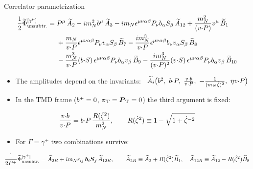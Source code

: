 \begin{frame}{Correlator parametrization}
  \footnotesize
  \begin{align*}
    \frac{1}{2}\widetilde \Phi^{[\gamma^\mu]}_{\text{unsubtr.}} ={}& P^\mu\, \widetilde{A}_2 - i m_N^2 b^\mu\, \widetilde{A}_3 - i m_N \epsilon^{\mu \nu \alpha \beta} P_\nu b_\alpha S_\beta\, \widetilde{A}_{12} + \frac{m_N^2}{(v {\cdot} P)} v^\mu\, \widetilde{B}_1\\
    & + \frac{m_N}{v {\cdot} P} \epsilon^{\mu \nu \alpha \beta} P_\nu v_\alpha S_\beta\, \widetilde{B}_7 - \frac{i m_N^3}{v {\cdot} P} \epsilon^{\mu \nu \alpha \beta} b_\nu v_\alpha S_\beta\, \widetilde{B}_8\\
    & - \frac{m_N^3}{v {\cdot} P} (b {\cdot} S)\, \epsilon^{\mu \nu \alpha \beta} P_\nu b_\alpha v_\beta\, \widetilde{B}_9 - \frac{i m_N^3}{(v {\cdot} P)^2} (v {\cdot} S)\, \epsilon^{\mu \nu \alpha \beta} P_\nu b_\alpha v_\beta\, \widetilde{B}_{10}
  \end{align*}
  \normalsize
  \begin{itemize}
    \item The amplitudes depend on the invariants: \ $\tAmp_i\big(\bvec^2,\ \bvec \tcdot P,\ \tfrac{v\tcdot \bvec}{v\tcdot P},\ -\tfrac{1}{(\mN\zetahat)^2},\ \eta v \tcdot P\big)$
    \item In the TMD frame ($b^+=0$, $\boldsymbol{v}_{\mathrm T}=\boldsymbol{P}_{\mathrm T}=0$) the third argument is fixed:
  \end{itemize}
  \[ \frac{v {\cdot} b}{v {\cdot} P} = b {\cdot} P\, \frac{R({\hat \zeta}^2)}{m_N^2}, \qquad R({\hat \zeta}^2) \equiv 1- \sqrt{1 + {\hat \zeta}^{-2}} \]
  \begin{itemize}
    \item For $\Gamma=\gamma^+$ two combinations survive:
  \end{itemize}
  \[ \frac{1}{2 P^+}\widetilde \Phi^{[\gamma^+]}_{\text{unsubtr.}} = \widetilde{A}_{2B} + i m_N \epsilon_{ij}\, \boldsymbol{b}_i \boldsymbol{S}_j\, \widetilde{A}_{12B}, \qquad
     \widetilde{A}_{2B} \equiv \widetilde{A}_2 + R({\hat \zeta}^2) \widetilde{B}_1, \quad \widetilde{A}_{12B} \equiv \widetilde{A}_{12} - R({\hat \zeta}^2) \widetilde{B}_8 \]
\end{frame}

